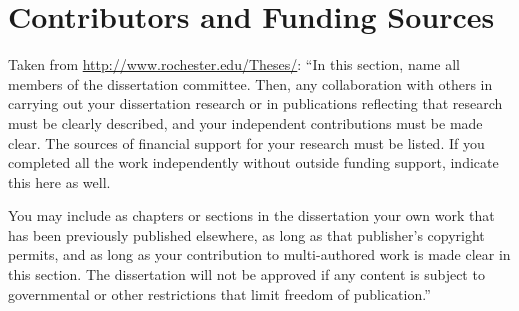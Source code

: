 \documentclass[\main/master.tex]{subfiles}
\begin{document}
\chapter*{Contributors and Funding Sources}
Taken from \url{http://www.rochester.edu/Theses/}: ``In this section, name all members of the dissertation committee. Then, any collaboration with others in carrying out your dissertation research or in publications reflecting that research must be clearly described,
and your independent contributions must be made clear. The sources of financial support for your research 
must be listed. If you completed all the work independently without outside funding support, indicate this
here as well. \par
You may include as chapters or sections in the dissertation your own work that has been previously published
elsewhere, as long as that publisher’s copyright permits, and as long as your contribution to multi-authored
work is made clear in this section. The dissertation will not be approved if any content is subject to
governmental or other restrictions that limit freedom of publication.''
\end{document}
